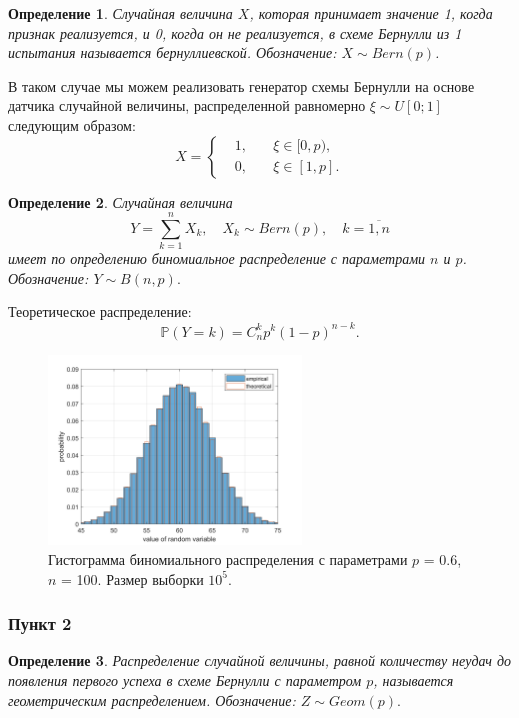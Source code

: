 \documentclass[oneside, final, 12pt]{article}
\def\P{{\mathbb{P} }}
\newtheorem{definition}{Определение}
\begin{document}
    \begin{definition}
        Случайная величина $X$, которая принимает значение 1, когда признак реализуется, и 0, когда он не 
		реализуется, в схеме Бернулли из 1 испытания называется бернуллиевской.
        Обозначение: $X \sim Bern(p)$.
    \end{definition}
    В таком случае мы можем реализовать генератор схемы Бернулли на основе датчика случайной 
	величины, распределенной равномерно $\xi \sim U[0;1]$ следующим образом:
    $$
	    X =
			\left \{ \begin{aligned} 
					       	& 1,	    &\quad{\xi \in  [0, p)}, \\ 
					       	& 0,    &\quad{\xi \in  [1, p]}. 
	    			    \end{aligned} 
			\right.
	$$
	\begin{definition}
        Случайная величина
        $$Y = \sum_{k=1}^{n} X_k, \quad X_k \sim Bern(p), \quad k = \overline{1,n} $$ 
        имеет по определению биномиальное распределение с параметрами $n$ и $p$.
        \newline Обозначение: $Y \sim B(n,p).$ 
    \end{definition}
    Теоретическое распределение: $$\P(Y = k ) = C_n^k p^k (1-p)^{n-k}.$$
    \begin{figure}[h!]
		\centering
		\includegraphics[width=0.6\textwidth]{../code/Task_1/pict/binom_vis_ex.png}
		\caption{Гистограмма биномиального распределения с параметрами $p$ = 0.6, $n$ = 100.
		\newline \centering  Размер выборки $10^5.$}
    \end{figure}

\subsubsection{Пункт 2}
    \begin{definition}
        Распределение случайной величины, равной количеству неудач до появления
		первого успеха в схеме Бернулли с параметром $p$, называется геометрическим распределением.
        	Обозначение: $Z\sim Geom(p).$ 
    \end{definition}
\end{document}
